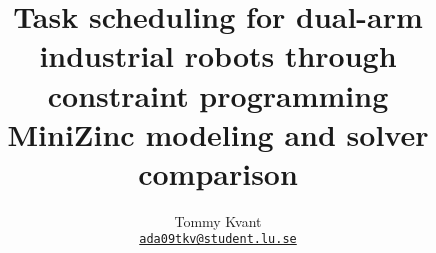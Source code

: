 \documentclass{cslthse-msc}
\author{
	Tommy Kvant \\
	{\normalsize \href{mailto:ada09tkv@student.lu.se}{\texttt{ada09tkv@student.lu.se}}}
}
\title{Task scheduling for dual-arm industrial robots through constraint programming\\\large MiniZinc modeling and solver comparison}
\begin{document}
\makefrontmatter









\begin{appendices}


\end{appendices}
\end{document}
